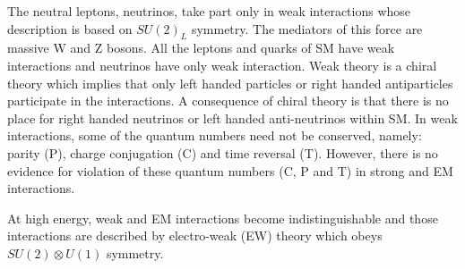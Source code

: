 The neutral leptons, neutrinos, take part only in weak interactions whose description is based on $SU(2)_L$ symmetry. The mediators of this force are massive W and Z bosons. All the leptons and quarks of SM have weak interactions and neutrinos have only weak interaction. Weak theory is a chiral theory which implies that only left handed particles or right handed antiparticles participate in the interactions. A consequence of chiral theory is that there is no place for right handed neutrinos or left handed anti-neutrinos within SM. In weak interactions, some of the quantum numbers need not be conserved, namely: parity (P), charge conjugation (C) and time reversal (T).
However, there is no evidence for violation of these quantum numbers (C, P and T) in strong and EM interactions.

At high energy, weak and EM interactions become indistinguishable and those interactions are described by electro-weak (EW) theory \cite{PhysRevLett.19.1264}\cite{Salam1959}\cite{Glashow:1959wxa} which obeys $SU(2)\otimes U(1)$ symmetry.

